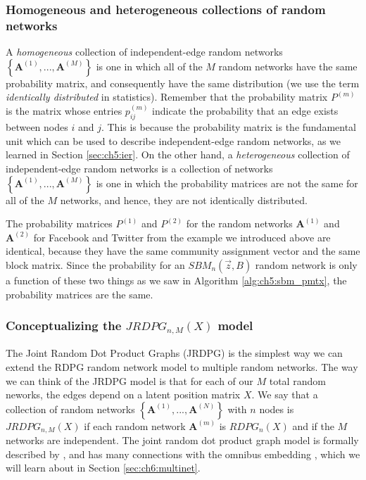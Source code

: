 \subsubsection{Homogeneous and heterogeneous collections of random networks}
A \textit{homogeneous} collection of independent-edge random networks $\left\{\mathbf A^{(1)}, ..., \mathbf A^{(M)}\right\}$ is one in which {all} of the $M$ random networks have the {same probability matrix}, and consequently have the same distribution (we use the term \textit{identically distributed} in statistics). Remember that the probability matrix $P^{(m)}$ is the matrix whose entries $p^{(m)}_{ij}$ indicate the probability that an edge exists between nodes $i$ and $j$. This is because the probability matrix is the fundamental unit which can be used to describe independent-edge random networks, as we learned in Section \ref{sec:ch5:ier}. On the other hand, a \textit{heterogeneous} collection of independent-edge random networks is a collection of networks $\left\{\mathbf A^{(1)}, ..., \mathbf A^{(M)}\right\}$ is one in which the probability matrices are {not} the same for all of the $M$ networks, and hence, they are {not} identically distributed. 

The probability matrices $P^{(1)}$ and $P^{(2)}$ for the random networks $\mathbf A^{(1)}$ and $\mathbf A^{(2)}$ for Facebook and Twitter from the example we introduced above are identical, because they have the same community assignment vector and the same block matrix. Since the probability for an $SBM_n(\vec z, B)$ random network is only a function of these two things as we saw in Algorithm \ref{alg:ch5:sbm_pmtx}, the probability matrices are the same.

\subsubsection{Conceptualizing the $JRDPG_{n,M}(X)$ model}

The Joint Random Dot Product Graphs (JRDPG) is the simplest way we can extend the RDPG random network model to multiple random networks. The way we can think of the JRDPG model is that for each of our $M$ total random neworks, the edges depend on a latent position matrix $X$. We say that a collection of random networks $\left\{\mathbf A^{(1)}, ..., \mathbf A^{(N)}\right\}$ with $n$ nodes is $JRDPG_{n,M}(X)$ if each random network $\mathbf A^{(m)}$ is $RDPG_n(X)$ and if the $M$ networks are independent. The joint random dot product graph model is formally described by \cite{Athreya2017Jan}, and has many connections with the omnibus embedding \cite{Levin2017}, which we will learn about in Section \ref{sec:ch6:multinet}.

